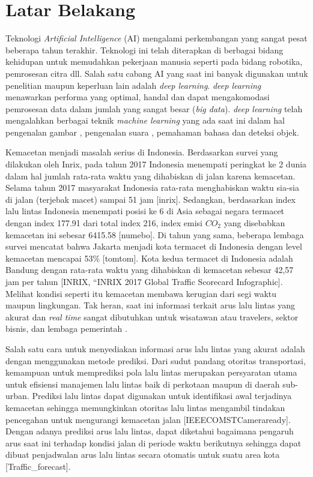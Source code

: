 \documentclass[../thesis.tex]{subfiles}
\begin{document}
\section{Latar Belakang}
Teknologi \textit{Artificial Intelligence} (AI) mengalami perkembangan yang sangat pesat beberapa tahun terakhir. Teknologi ini telah diterapkan di berbagai bidang kehidupan untuk memudahkan pekerjaan manusia seperti pada bidang robotika, pemrosesan citra dll. 
Salah satu cabang AI yang saat ini banyak digunakan untuk penelitian maupun keperluan lain adalah \textit{deep learning}. \textit{deep learning} menawarkan performa yang optimal, handal dan dapat mengakomodasi pemrosesan data dalam jumlah yang sangat besar (\textit{big data}). 
\textit{deep learning} telah mengalahkan berbagai teknik \textit{machine learning} yang ada saat ini dalam hal pengenalan gambar \cite{Krizhevsky2002ImageNet}, pengenalan suara \cite{Hinton2012Speech}, pemahaman bahasa \cite{Collobert2011NLP} dan deteksi objek.

Kemacetan menjadi masalah serius di Indonesia. Berdasarkan survei yang dilakukan oleh Inrix, pada tahun 2017 Indonesia menempati peringkat ke 2 dunia dalam hal jumlah rata-rata waktu yang dihabiskan di jalan karena kemacetan. Selama tahun 2017 masyarakat Indonesia rata-rata menghabiskan waktu sia-sia di jalan (terjebak macet) sampai 51 jam [inrix]. Sedangkan, berdasarkan index lalu lintas Indonesia menempati posisi ke 6 di Asia sebagai negara termacet dengan index 177.91 dari total index 216, index emisi $CO_2$ yang disebabkan kemacetan ini sebesar 6415.58 [numebo]. 
Di tahun yang sama, beberapa lembaga survei mencatat bahwa Jakarta menjadi kota termacet di Indonesia dengan level kemacetan mencapai 53\% [tomtom]. Kota kedua termacet di Indonesia adalah Bandung dengan rata-rata waktu yang dihabiskan di kemacetan sebesar 42,57 jam per tahun [INRIX, “INRIX 2017 Global Traffic Scorecard Infographic]. Melihat kondisi seperti itu kemacetan membawa kerugian dari segi waktu maupun lingkungan.
Tak heran, saat ini informasi terkait arus lalu lintas yang akurat dan \textit{real time} sangat dibutuhkan untuk wisatawan atau travelers, sektor bisnis, dan lembaga pemerintah \cite{Zhang2008DynaCAS}.

Salah satu cara untuk menyediakan informasi arus lalu lintas yang akurat adalah dengan menggunakan metode prediksi. Dari sudut pandang otoritas transportasi, kemampuan untuk memprediksi pola lalu lintas merupakan persyaratan utama untuk efisiensi manajemen lalu lintas baik di perkotaan maupun di daerah sub-urban. Prediksi lalu lintas dapat digunakan untuk identifikasi awal terjadinya kemacetan sehingga memungkinkan otoritas lalu lintas mengambil tindakan pencegahan untuk mengurangi kemacetan
jalan [IEEECOMSTCameraready]. Dengan adanya prediksi arus lalu lintas, dapat diketahui bagaimana pengaruh arus saat ini terhadap kondisi jalan di periode waktu berikutnya sehingga dapat dibuat penjadwalan arus lalu lintas secara otomatis untuk suatu area kota [Traffic_forecast].
\end{document}
